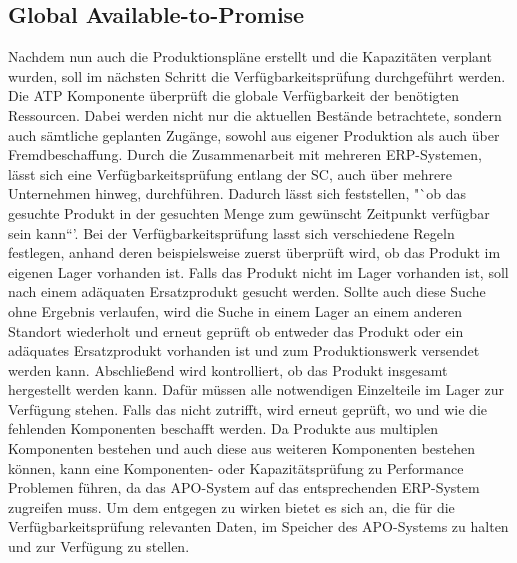 \subsection{Global Available-to-Promise}
Nachdem nun auch die Produktionspläne erstellt und die Kapazitäten verplant wurden, soll im nächsten Schritt die Verfügbarkeitsprüfung durchgeführt werden. 
Die \ac{ATP} Komponente überprüft die globale Verfügbarkeit der benötigten Ressourcen. Dabei werden nicht nur die aktuellen Bestände betrachtete, sondern auch sämtliche geplanten Zugänge, sowohl aus eigener Produktion als auch über Fremdbeschaffung. Durch die Zusammenarbeit mit mehreren \ac{ERP}-Systemen, lässt sich eine Verfügbarkeitsprüfung entlang der \ac{SC}, auch über mehrere Unternehmen hinweg, durchführen. Dadurch lässt sich feststellen, "`ob das gesuchte Produkt in der gesuchten Menge zum gewünscht Zeitpunkt verfügbar sein kann“'. \cite[Abschnitt 4.3.4, Seite 18]{scm:script_17_1}
Bei der Verfügbarkeitsprüfung lasst sich verschiedene Regeln festlegen, anhand deren beispielsweise zuerst überprüft wird, ob das Produkt im eigenen Lager vorhanden ist. Falls das Produkt nicht im Lager vorhanden ist, soll nach einem adäquaten Ersatzprodukt gesucht werden. Sollte auch diese Suche ohne Ergebnis verlaufen, wird die Suche in einem Lager an einem anderen Standort wiederholt und erneut geprüft ob entweder das Produkt oder ein adäquates Ersatzprodukt vorhanden ist und zum Produktionswerk versendet werden kann. Abschließend wird kontrolliert, ob das Produkt insgesamt hergestellt werden kann. Dafür müssen alle notwendigen Einzelteile im Lager zur Verfügung stehen. Falls das nicht zutrifft, wird erneut geprüft, wo und wie die fehlenden Komponenten beschafft werden. \cite[Abschnitt 4.3.4, Seite 18 f]{scm:script_17_1}
Da Produkte aus multiplen Komponenten bestehen und auch diese aus weiteren Komponenten bestehen können, kann eine Komponenten- oder Kapazitätsprüfung zu Performance Problemen führen, da das \ac{APO}-System auf das entsprechenden \ac{ERP}-System zugreifen muss. Um dem entgegen zu wirken bietet es sich an, die für die Verfügbarkeitsprüfung relevanten Daten, im Speicher des APO-Systems zu halten und zur Verfügung zu stellen.

